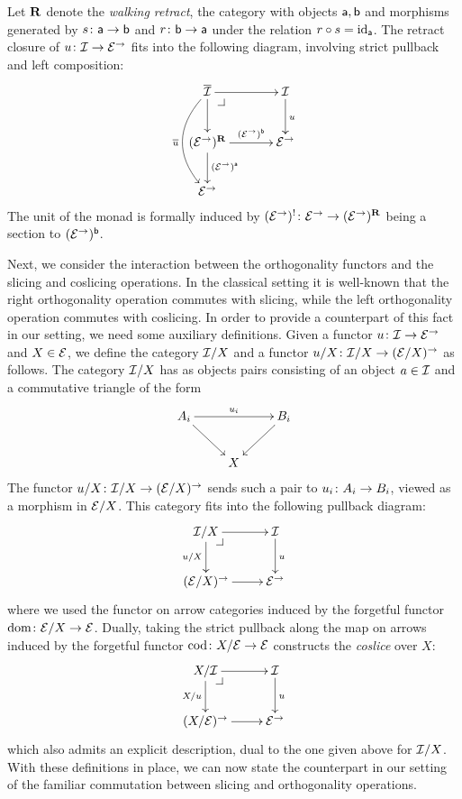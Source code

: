 \documentclass[reqno,10pt,a4paper,oneside]{amsart}
\begin{document}
\begin{remark} Let $\ret$ denote the \emph{walking retract}, \ie the category with objects $\retA, \retB$ and morphisms generated by $s \co \retA \to \retB$ and $r \co \retB \to \retA$ under the relation $r \cc s = \id_{\retA}$. The retract closure of $u \co \cal{I} \to \catE^\to$ fits into the following diagram, involving strict pullback and left composition:
\[
\xymatrix@C+1em{
  \overline{\cal{I}}
  \ar[r]
  \ar[d]
  \ar@/_2em/[dd]_{\overline{u}}
  \pullback{dr}
&
  \cal{I}
  \ar[d]^{u}
\\
  (\catE^{\to})^{\ret}
  \ar[r]^-{(\catE^{\to})^{\retB}}
  \ar[d]^{(\catE^{\to})^{\retA}}
&
  \catE^{\to}
\\
  \catE^{\to}
}
\]
The unit of the monad is formally induced by $(\catE^{\to})^{\canonical} \co \catE^{\to} \to (\catE^{\to})^{\ret}$ being a section to $(\catE^{\to})^{\retB}$.
\end{remark}




Next, we consider the interaction between the orthogonality functors and the slicing and coslicing operations. 
 In the classical setting it is well-known that the right orthogonality operation commutes with slicing, while the left orthogonality operation commutes with coslicing.  In order to provide a counterpart of this fact in our setting, we need some auxiliary definitions. Given a functor $u \co \cal{I} \to \catE^{\to}$ and $X \in \catE$, we define the category $\cal{I}/X$
and a functor $u/X \co \cal{I}/X \to (\cal{E}/X)^\to$ as follows. The category $\cal{I}/X$ has as objects pairs consisting of an object $a \in \cal{I}$ and a commutative triangle of the form
\[
\xymatrix{
A_i \ar[dr] \ar[rr]^{u_i} & & B_i \ar[dl] \\
 & X }
 \]
The functor $u/X \co \cal{I}/X \to (\cal{E}/X)^\to$ sends such a pair to $u_i \co A_i \to B_i$, viewed as a morphism in $\cal{E}/X$. This category fits into the
following pullback diagram:
\[
\xymatrix{
  \cal{I}/X
  \ar[r]
  \ar[d]_{u/X}
  \pullback{dr}
&
  \cal{I}
  \ar[d]^{u}
\\
  (\catE/X)^{\to}
  \ar[r]
&
  \catE^{\to}
}
\]
where we used the functor on arrow categories induced by the forgetful functor $\operatorname{dom} \co \catE/X \to \catE$.  Dually, taking the strict pullback along the map on arrows induced by the forgetful functor 
$\operatorname{cod} \co X/\cal{E} \to \catE$ constructs the \emph{coslice} over $X$:
\[
\xymatrix{
  X/\cal{I}
  \ar[r]
  \ar[d]_{X/u}
  \pullback{dr}
&
  \cal{I}
  \ar[d]^{u}
\\
  (X/\catE)^{\to}
  \ar[r]
&
  \catE^{\to}
}
\]
which also admits an explicit description, dual to the one given above for $\cal{I}/X$. With these definitions in place, we can now state the counterpart in our setting of the familiar commutation between slicing and orthogonality operations. 
\end{document}
